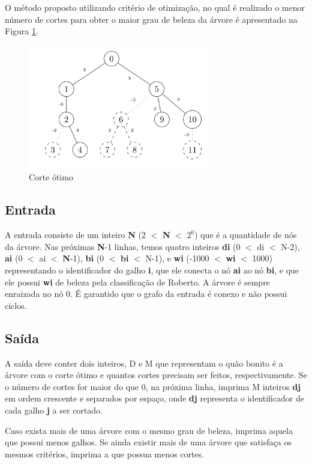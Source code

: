 \documentclass[12pt]{article}
\begin{document}
O método proposto utilizando critério de otimização, no qual é realizado o menor número de cortes para obter o maior grau de beleza da árvore é apresentado na Figura \ref{fig:2575_b}.

\begin{figure}[ht]
\centering
\includegraphics[width=.5\textwidth]{2575_b.png}
\caption{Corte ótimo}
\label{fig:2575_b}
\end{figure}


\subsection{Entrada}

A entrada consiste de um inteiro \textbf{N} (2 $<$ \textbf{N} $<$ $2^{6}$) que é a quantidade de nós da árvore. Nas próximas \textbf{N}-1 linhas, temos quatro inteiros \textbf{di} (0 $<$ di $<$ N-2), \textbf{ai} (0 $<$ ai $<$ \textbf{N}-1), \textbf{bi} (0 $<$ \textbf{bi} $<$ N-1),  e \textbf{wi}  (-1000 $<$ \textbf{wi} $<$ 1000) representando o identificador do galho \textbf{i}, que ele conecta o nó \textbf{ai} ao nó \textbf{bi}, e que ele possui \textbf{wi} de beleza pela classificação de Roberto. A árvore é sempre enraizada no nó 0. É garantido que o grafo da entrada é conexo e não possui ciclos.

\subsection{Saída}

A saída deve conter dois inteiros, D e M que representam o quão bonito é a árvore com o corte ótimo e quantos cortes precisam ser feitos, respectivamente. Se o número de cortes for maior do que 0, na próxima linha, imprima M inteiros \textbf{dj} em ordem crescente e separados por espaço, onde \textbf{dj} representa o identificador de cada galho \textbf{j} a ser cortado.

Caso exista mais de uma árvore com o mesmo grau de beleza, imprima aquela que possui menos galhos. Se ainda existir mais de uma árvore que satisfaça os mesmos critérios, imprima a que possua menos cortes.
\end{document}
